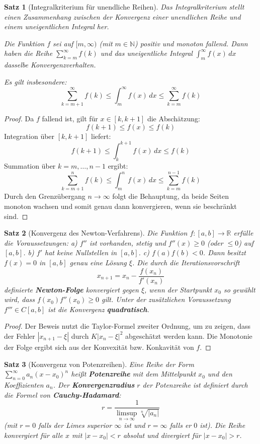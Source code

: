 \documentclass{article}
\newtheorem{satz}{Satz}[section]
\theoremstyle{definition}
\begin{document}
\begin{satz}[Integralkriterium für unendliche Reihen]
Das Integralkriterium stellt einen Zusammenhang zwischen der Konvergenz einer unendlichen Reihe und einem uneigentlichen Integral her.

Die Funktion $f$ sei auf $[m, \infty)$ (mit $m \in \mathbb{N}$) positiv und monoton fallend. Dann haben die Reihe $\sum_{k=m}^{\infty} f(k)$ und das uneigentliche Integral $\int_{m}^{\infty} f(x) \, dx$ dasselbe Konvergenzverhalten.

Es gilt insbesondere:
$$\sum_{k=m+1}^{\infty} f(k) \le \int_{m}^{\infty} f(x) \, dx \le \sum_{k=m}^{\infty} f(k)$$


\end{satz}
\begin{proof}
Da $f$ fallend ist, gilt für $x \in [k, k+1]$ die Abschätzung:
$$f(k+1) \le f(x) \le f(k)$$
Integration über $[k, k+1]$ liefert:
$$f(k+1) \le \int_{k}^{k+1} f(x) \, dx \le f(k)$$
Summation über $k = m, \dots, n-1$ ergibt:
$$\sum_{k=m+1}^{n} f(k) \le \int_{m}^{n} f(x) \, dx \le \sum_{k=m}^{n-1} f(k)$$
Durch den Grenzübergang $n \to \infty$ folgt die Behauptung, da beide Seiten monoton wachsen und somit genau dann konvergieren, wenn sie beschränkt sind.
\end{proof}
\begin{satz}[Konvergenz des Newton-Verfahrens]
Die Funktion $f: [a,b] \to \mathbb{R}$ erfülle die Voraussetzungen:
a) $f''$ ist vorhanden, stetig und $f''(x) \ge 0$ (oder $\le 0$) auf $[a,b]$.
b) $f'$ hat keine Nullstellen in $[a,b]$.
c) $f(a)f(b) < 0$.
Dann besitzt $f(x)=0$ in $[a,b]$ genau eine Lösung $\xi$. Die durch die Iterationsvorschrift
$$x_{n+1} = x_n - \frac{f(x_n)}{f'(x_n)}$$
definierte \textbf{Newton-Folge} konvergiert gegen $\xi$, wenn der Startpunkt $x_0$ so gewählt wird, dass $f(x_0)f''(x_0) \ge 0$ gilt. Unter der zusätzlichen Voraussetzung $f''' \in C[a,b]$ ist die Konvergenz \textbf{quadratisch}.


\end{satz}
\begin{proof}
Der Beweis nutzt die Taylor-Formel zweiter Ordnung, um zu zeigen, dass der Fehler $|x_{n+1}-\xi|$ durch $K|x_n-\xi|^2$ abgeschätzt werden kann. Die Monotonie der Folge ergibt sich aus der Konvexität bzw. Konkavität von $f$.
\end{proof}
\begin{satz}[Konvergenz von Potenzreihen]
Eine Reihe der Form $\sum_{n=0}^\infty a_n (x-x_0)^n$ heißt \textbf{Potenzreihe} mit dem Mittelpunkt $x_0$ und den Koeffizienten $a_n$.
Der \textbf{Konvergenzradius} $r$ der Potenzreihe ist definiert durch die Formel von \textbf{Cauchy-Hadamard}:
$$r = \frac{1}{\limsup_{n \to \infty} \sqrt[n]{|a_n|}}$$
(mit $r=0$ falls der Limes superior $\infty$ ist und $r=\infty$ falls er $0$ ist).
Die Reihe konvergiert für alle $x$ mit $|x-x_0| < r$ absolut und divergiert für $|x-x_0| > r$.


\end{satz}
\end{document}
